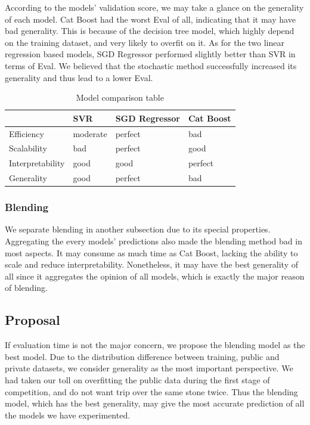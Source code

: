 \documentclass[10pt,letterpaper]{article}
\begin{document}
According to the models' validation score, we may take a glance on the generality of each model. Cat Boost had the worst Eval of all, indicating that it may have bad generality. This is because of the decision tree model, which highly depend on the training dataset, and very likely to overfit on it. As for the two linear regression based models, SGD Regressor performed slightly better than SVR in terms of Eval. We believed that the stochastic method successfully increased its generality and thus lead to a lower Eval. 

\begin{table}[h]
  \centering
  \begin{tabularx}{0.8\textwidth}{p{2.5cm}|X|X|X}
    \hline
     & \textbf{SVR} & \textbf{SGD Regressor} & \textbf{Cat Boost} \\
    \hline
    Efficiency & moderate & perfect & bad \\
    \hline
    Scalability & bad & perfect & good \\
    \hline
    Interpretability & good & good & perfect \\
    \hline
	Generality & good & perfect & bad \\
    \hline
  \end{tabularx}
  \caption{Model comparison table}
  \label{tab:compareTable}
\end{table}

\subsubsection{Blending}

We separate blending in another subsection due to its special properties. Aggregating the every models' predictions also made the blending method bad in most aspects. It may consume as much time as Cat Boost, lacking the ability to scale and reduce interpretability. Nonetheless, it may have the best generality of all since it aggregates the opinion of all models, which is exactly the major reason of blending. 

\subsection{Proposal}

If evaluation time is not the major concern, we propose the blending model as the best model. Due to the distribution difference between training, public and private datasets, we consider generality as the most important perspective. We had taken our toll on overfitting the public data during the first stage of competition, and do not want trip over the same stone twice. Thus the blending model, which has the best generality, may give the most accurate prediction of all the models we have experimented. 
\end{document}

